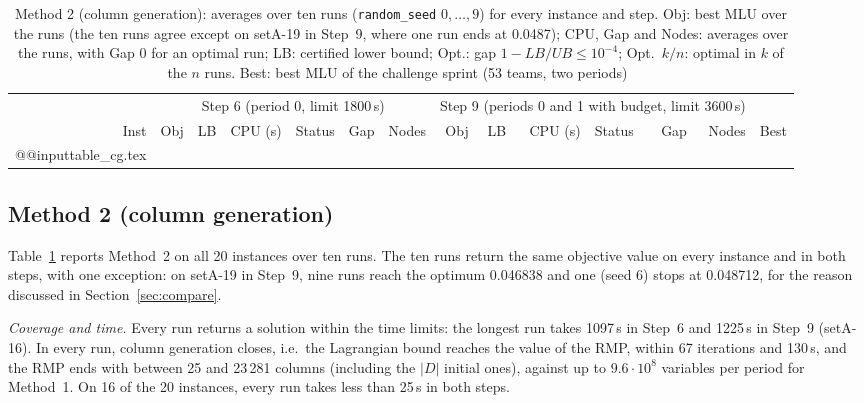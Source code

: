 \documentclass[conference]{IEEEtran}
\begin{document}
\begin{table}[t]
\centering\footnotesize
\caption{Method 2 (column generation): averages over ten runs (\texttt{random\_seed} $0,\dots,9$) for every instance and step. Obj: best MLU over the runs (the ten runs agree except on setA-19 in Step~9, where one run ends at 0.0487); CPU, Gap and Nodes: averages over the runs, with Gap 0 for an optimal run; LB: certified lower bound; Opt.: gap $1-LB/UB\le10^{-4}$; Opt.~$k/n$: optimal in $k$ of the $n$ runs. Best: best MLU of the challenge sprint (53 teams, two periods)~\cite{roadefrepo}}\label{tab:cg}
\setlength{\tabcolsep}{3.6pt}
\begin{tabular}{@{}r|rrrlrr|rrrlrr|r@{}}
\toprule
 & \multicolumn{6}{c|}{Step 6 (period 0, limit 1800\,s)} & \multicolumn{6}{c|}{Step 9 (periods 0 and 1 with budget, limit 3600\,s)} & \\
Inst & Obj & LB & CPU (s) & Status & Gap & Nodes & Obj & LB & CPU (s) & Status & Gap & Nodes & Best\\
\midrule
\csname @@input\endcsname table_cg.tex
\bottomrule
\end{tabular}
\end{table}

\subsection{Method 2 (column generation)}\label{sec:cgres}
Table~\ref{tab:cg} reports Method~2 on all 20 instances over ten runs. The ten runs return the same objective value on every instance and in both steps, with one exception: on setA-19 in Step~9, nine runs reach the optimum 0.046838 and one (seed 6) stops at 0.048712, for the reason discussed in Section~\ref{sec:compare}.

\emph{Coverage and time.} Every run returns a solution within the time limits: the longest run takes 1097\,s in Step~6 and 1225\,s in Step~9 (setA-16). In every run, column generation closes, i.e.\ the Lagrangian bound reaches the value of the RMP, within 67 iterations and 130\,s, and the RMP ends with between 25 and 23\,281 columns (including the $|D|$ initial ones), against up to $9.6\cdot10^8$ variables per period for Method~1. On 16 of the 20 instances, every run takes less than 25\,s in both steps.
\end{document}
